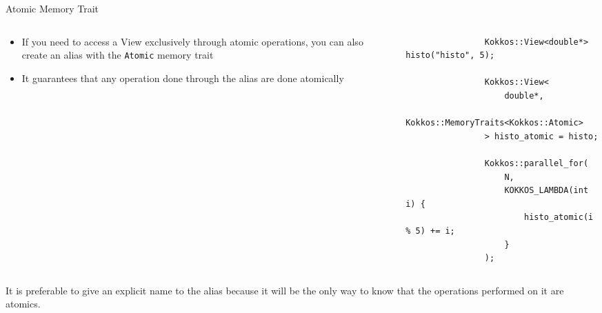 \documentclass[
    aspectratio=169,
    \createHandout
]{beamer}
\begin{document}
\begin{frame}[fragile]{Atomic Memory Trait}
    \begin{columns}
        \begin{column}{0.40\linewidth}
            \begin{itemize}
                \item If you need to access a View exclusively through atomic operations, you
                can also create an alias with the \texttt{Atomic} memory trait
                \item It guarantees that any operation done through the alias are done atomically
            \end{itemize}
        \end{column}
        \begin{column}{0.6\linewidth}
            \begin{verbatim}
                Kokkos::View<double*> histo("histo", 5);

                Kokkos::View<
                    double*,
                    Kokkos::MemoryTraits<Kokkos::Atomic>
                > histo_atomic = histo;

                Kokkos::parallel_for(
                    N,
                    KOKKOS_LAMBDA(int i) {
                        histo_atomic(i % 5) += i;
                    }
                );
            \end{verbatim}
        \end{column}
    \end{columns}
     It is preferable to give an explicit name to the alias because it will be the only way to know that the operations performed on it are atomics.
\end{frame}
\end{document}
